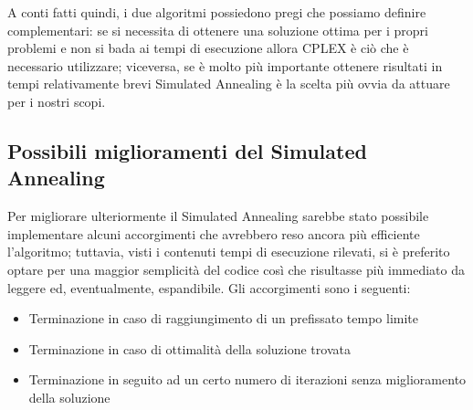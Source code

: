 \documentclass[preprint,12pt]{elsarticle}
\begin{document}
A conti fatti quindi, i due algoritmi possiedono pregi che possiamo definire complementari: se si necessita di ottenere una soluzione ottima per i propri problemi e non si bada ai tempi di esecuzione allora CPLEX è ciò che è necessario utilizzare; viceversa, se è molto più importante ottenere risultati in tempi relativamente brevi Simulated Annealing è la scelta più ovvia da attuare per i nostri scopi. 

\subsection{\textbf{Possibili miglioramenti del Simulated Annealing}}

Per migliorare ulteriormente il Simulated Annealing sarebbe stato possibile implementare alcuni accorgimenti che avrebbero reso ancora più efficiente l'algoritmo; tuttavia, visti i contenuti tempi di esecuzione rilevati, si è preferito optare per una maggior semplicità del codice così che risultasse più immediato da leggere ed, eventualmente, espandibile. Gli accorgimenti sono i seguenti:

\begin{itemize}
\item Terminazione in caso di raggiungimento di un prefissato tempo limite
\item Terminazione in caso di ottimalità della soluzione trovata
\item Terminazione in seguito ad un certo numero di iterazioni senza miglioramento della soluzione
\end{itemize}














\end{document}
